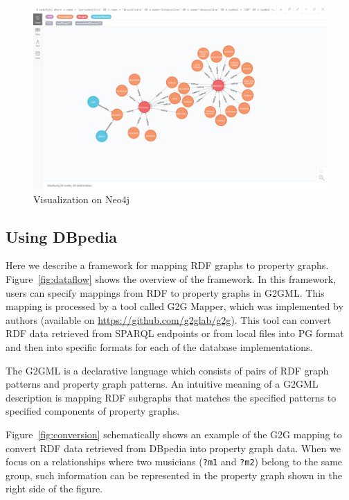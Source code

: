 \documentclass[runningheads]{llncs}
\begin{document}
\begin{figure}
\center
\includegraphics[width=1.0\textwidth]{neo4jexample2.png}
\caption{Visualization on Neo4j}
\label{fig:neo4jexample2.png}
\end{figure}
 
\subsection{Using DBpedia}
 
Here we describe a framework for mapping RDF graphs to property graphs.
Figure~\ref{fig:dataflow} shows the overview of the framework.
In this framework, users can specify mappings from RDF to property graphs in G2GML.
This mapping is processed by a tool called G2G Mapper, which was implemented by authors (available on \url{https://github.com/g2glab/g2g}). This tool can convert RDF data retrieved from SPARQL endpoints or from local files into PG format and then into specific formats for each of the database implementations.
 
The G2GML is a declarative language which consists of pairs of RDF graph patterns and property graph patterns. 
An intuitive meaning of a G2GML description is mapping RDF subgraphs that matches the specified patterns to specified components of property graphs. 
 
Figure~\ref{fig:conversion} schematically shows an example of the G2G mapping to convert RDF data retrieved from DBpedia into property graph data. 
When we focus on a relationships where two musicians (\texttt{?m1} and \texttt{?m2}) belong to the same group, such information can be represented in the property graph shown in the right side of the figure.
 
\end{document}
